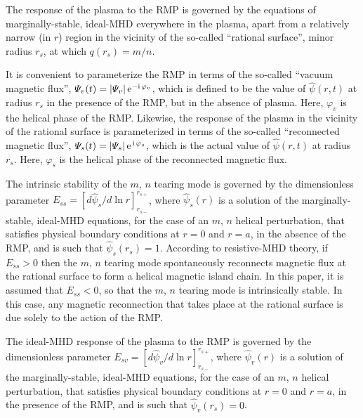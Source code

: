 \documentclass[12pt,prb,aps]{revtex4-1}
\begin{document}
The response of the plasma to the RMP is governed by the equations of marginally-stable, ideal-MHD everywhere in the
plasma, apart from a relatively narrow (in $r$) region in the vicinity of the so-called  ``rational surface'', minor radius $r_s$, 
at which $q(r_s)=m/n$.\cite{rfa}

It is convenient to parameterize the RMP in terms of the so-called ``vacuum magnetic flux'', ${\mit\Psi}_v(t) = |{\mit\Psi}_v|\,{\rm e}^{-{\rm i}\,\varphi_v}$,
which is defined to be the value of $\hat{\psi}(r,t)$ at radius $r_s$ in the presence of the RMP, but in the absence of plasma. Here,
$\varphi_v$ is the helical phase of the RMP. Likewise, the response of the plasma in the vicinity of the rational
surface is parameterized in terms of the so-called ``reconnected magnetic flux'', ${\mit\Psi}_s(t)=|{\mit\Psi}_s|\,{\rm e}^{\,{\rm i}\,\varphi_s}$, 
which is the actual value of $\hat{\psi}(r,t)$ at radius $r_s$. Here, $\varphi_s$ is the helical phase of
the reconnected magnetic flux.

The intrinsic stability of the $m$, $n$ tearing mode is governed by the dimensionless parameter
$E_{ss}= [d\hat{\psi}_s/d\ln r]_{r_{s-}}^{r_{s+}}$, where $\hat{\psi}_s(r)$
is a solution of the marginally-stable, ideal-MHD equations, for the case of an $m$, $n$ helical
perturbation, that satisfies physical boundary conditions at $r=0$ and $r=a$, in the absence of the
RMP, and is such that $\hat{\psi}_s(r_s)=1$.\cite{fkr,am1} According to resistive-MHD theory,\cite{fkr,ruth}
if $E_{ss}>0$ then the $m$, $n$ tearing mode spontaneously reconnects magnetic flux at the rational
surface to form a helical magnetic island chain. In this paper, it is assumed that $E_{ss}<0$, so that the
$m$, $n$ tearing mode is intrinsically stable. In this case, any magnetic reconnection that takes place
at the rational surface is due solely to the action of the RMP.

The ideal-MHD response of the plasma to the RMP is governed by the dimensionless parameter
$E_{sv}= [d\hat{\psi}_v/d\ln r]_{r_{s-}}^{r_{s+}}$, where $\hat{\psi}_v(r)$
is a solution of the marginally-stable, ideal-MHD equations, for the case of an $m$, $n$ helical
perturbation, that satisfies physical boundary conditions at $r=0$ and $r=a$, in the presence of the
RMP, and is such that $\hat{\psi}_v(r_s)=0$.\cite{am1} 
\end{document}
